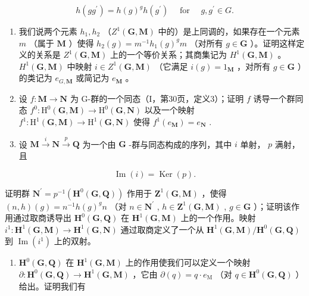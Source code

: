 \[
h (g g ^ {\prime}) = h (g) ^ {g} h (g ^ {\prime}) \quad \text { for } \quad g, g ^ {\prime} \in G.
\]

\begin{enumerate}
\def\labelenumi{\alph{enumi})}
\item
  我们说两个元素 \(h_1, h_2\) （\(Z^1(\mathbf{G}, \mathbf{M})\) 中的）是上同调的，如果存在一个元素 \(m\) （属于 \(\mathbf{M}\) ）使得 \(h_2(g) = m^{-1} h_1(g)^g m\) （对所有 \(g \in \mathbf{G}\) ）。证明这样定义的关系是 \(Z^1(\mathbf{G}, \mathbf{M})\) 上的一个等价关系；其商集记为 \(H^1(\mathbf{G}, \mathbf{M})\) 。\(H^1(\mathbf{G}, \mathbf{M})\) 中映射 \(i \in Z^1(\mathbf{G}, \mathbf{M})\) （它满足 \(i(g) = 1_{\mathbf{M}}\) ，对所有 \(g \in \mathbf{G}\) ）的类记为 \(e_{G,\mathbf{M}}\) 或简记为 \(e_{\mathbf{M}}\) 。
\item
  设 \(f: \mathbf{M} \to \mathbf{N}\) 为 G-群的一个同态（I，第30页，定义3）；证明 \(f\) 诱导一个群同态 \(f^{0}: \mathrm{H}^{0}(\mathbf{G}, \mathbf{M}) \to \mathrm{H}^{0}(\mathbf{G}, \mathbf{N})\) 以及一个映射 \(f^{1}: \mathrm{H}^{1}(\mathbf{G}, \mathbf{M}) \to \mathrm{H}^{1}(\mathbf{G}, \mathbf{N})\) 使得 \(f^{1}(e_{\mathbf{M}}) = e_{\mathbf{N}}\) .
\item
  设 \(\mathbf{M} \xrightarrow{i} \mathbf{N} \xrightarrow{p} \mathbf{Q}\) 为一个由 \(\mathbf{G}\) -群与同态构成的序列，其中 \(i\) 单射， \(p\) 满射，且
\end{enumerate}

\[
\operatorname{Im} (i) = \operatorname{Ker} (p).
\]

证明群 \(\mathbf{N}^{\prime}=p^{-1}(\mathbf{H}^{0}(\mathbf{G},\mathbf{Q}))\) 作用于 \(\mathbf{Z}^{1}(\mathbf{G},\mathbf{M})\) ，使得 \((n,h)(g)=n^{-1}h(g)^{g}n\) （对 \(n\in\mathbf{N}^{\prime}\) , \(h\in\mathbf{Z}^{1}(\mathbf{G},\mathbf{M})\) , \(g\in\mathbf{G}\) ）；证明该作用通过取商诱导出 \(\mathbf{H}^{0}(\mathbf{G},\mathbf{Q})\) 在 \(\mathbf{H}^{1}(\mathbf{G},\mathbf{M})\) 上的一个作用。映射 \(i^{1}:\mathbf{H}^{1}(\mathbf{G},\mathbf{M})\to\mathbf{H}^{1}(\mathbf{G},\mathbf{N})\) 通过取商定义了一个从 \(\mathbf{H}^{1}(\mathbf{G},\mathbf{M})/\mathbf{H}^{0}(\mathbf{G},\mathbf{Q})\) 到 \(\operatorname{Im}(i^{1})\) 上的双射。

\begin{enumerate}
\def\labelenumi{\alph{enumi})}
\setcounter{enumi}{3}
\tightlist
\item
  \(\mathbf{H}^0 (\mathbf{G},\mathbf{Q})\) 在 \(\mathbf{H}^{1}(\mathbf{G},\mathbf{M})\) 上的作用使我们可以定义一个映射 \(\partial :\mathbf{H}^{0}(\mathbf{G},\mathbf{Q})\to \mathbf{H}^{1}(\mathbf{G},\mathbf{M})\) ，它由 \(\partial (q) = q\cdot e_{\mathrm{M}}\) （对 \(q\in \mathbf{H}^0 (\mathbf{G},\mathbf{Q})\) ）给出。证明我们有
\end{enumerate}

